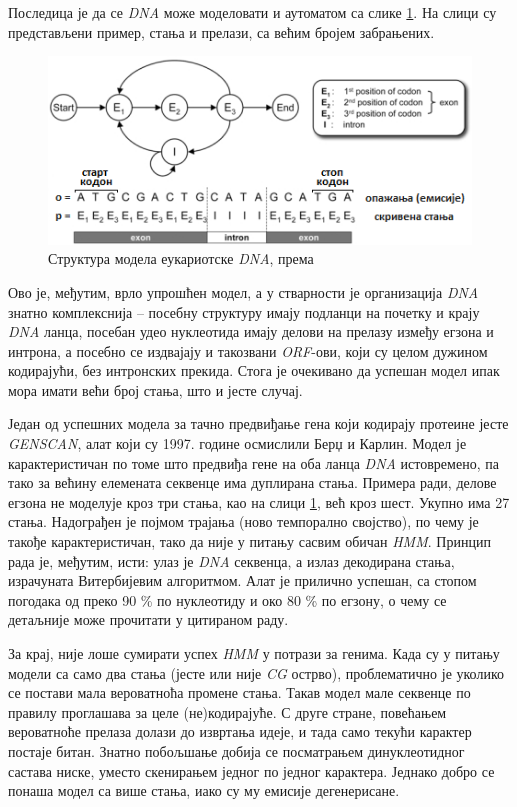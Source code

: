 \documentclass[12pt,oneside]{memoir}
\begin{document}
\begin{CJK}{UTF8}{ipxm}
Последица је да се \textit{DNA} може моделовати и аутоматом са слике \ref{fig:eukariote}. На слици су представљени пример, стања и прелази, са већим бројем забрањених.

\begin{figure}[!ht]
  \centering
  \includegraphics[width=.85\textwidth]{eukariote.png}
  \caption{Структура модела еукариотске \textit{DNA}, према \cite{eukary}}
  \label{fig:eukariote}
\end{figure}

Ово је, међутим, врло упрошћен модел, а у стварности је организација \textit{DNA} знатно комплекснија -- посебну структуру имају подланци на почетку и крају \textit{DNA} ланца, посебан удео нуклеотида имају делови на прелазу између егзона и интрона, а посебно се издвајају и такозвани \textit{ORF}-ови, који су целом дужином кодирајући, без интронских прекида\cite{henderson1997, huson2020}. Стога је очекивано да успешан модел ипак мора имати већи број стања, што и јесте случај.

Један од успешних модела за тачно предвиђање гена који кодирају протеине јесте \textit{GENSCAN}, алат који су 1997. године осмислили Берџ и Карлин\cite{genscan, burge1997}. Модел је карактеристичан по томе што предвиђа гене на оба ланца \textit{DNA} истовремено, па тако за већину елемената секвенце има дуплирана стања. Примера ради, делове егзона не моделује кроз три стања, као на слици \ref{fig:eukariote}, већ кроз шест. Укупно има 27 стања. Надограђен је појмом трајања (ново темпорално својство), по чему је такође карактеристичан, тако да није у питању сасвим обичан \textit{HMM}. Принцип рада је, међутим, исти: улаз је \textit{DNA} секвенца, а излаз декодирана стања, израчуната Витербијевим алгоритмом. Алат је прилично успешан, са стопом погодака од преко 90 \% по нуклеотиду и око 80 \% по егзону, о чему се детаљније може прочитати у цитираном раду.

За крај, није лоше сумирати успех \textit{HMM} у потрази за генима. Када су у питању модели са само два стања (јесте или није \textit{CG} острво), проблематично је уколико се постави мала вероватноћа промене стања. Такав модел мале секвенце по правилу проглашава за целе (не)кодирајуће. С друге стране, повећањем вероватноће прелаза долази до извртања идеје, и тада само текући карактер постаје битан. Знатно побољшање добија се посматрањем динуклеотидног састава ниске, уместо скенирањем једног по једног карактера. Једнако добро се понаша модел са више стања, иако су му емисије дегенерисане.


\end{CJK}
\end{document}

